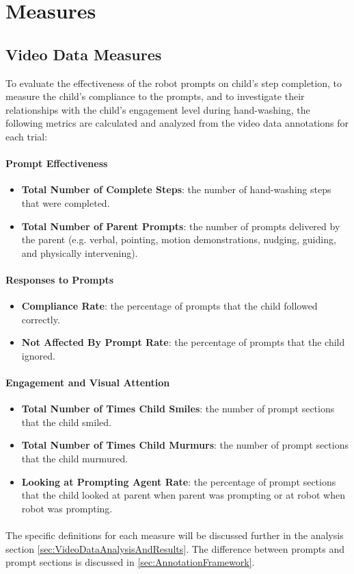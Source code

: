\section{Measures}
\label{sec:measures}

\subsection{Video Data Measures}
To evaluate the effectiveness of the robot prompts on child's step completion, to measure the child's compliance to the prompts, and to investigate their relationships with the child's engagement level during hand-washing, the following metrics are calculated and analyzed from the video data annotations for each trial:


\paragraph{Prompt Effectiveness}
\begin{itemize}
	\item \textbf{Total Number of Complete Steps}: the number of hand-washing steps that were completed.
	\item \textbf{Total Number of Parent Prompts}: the number of prompts delivered by the parent (e.g. verbal, pointing, motion demonstrations, nudging, guiding, and physically intervening).
\end{itemize}

\paragraph{Responses to Prompts}
\begin{itemize}
	\item \textbf{Compliance Rate}: the percentage of prompts that the child followed correctly.
	\item \textbf{Not Affected By Prompt Rate}: the percentage of prompts that the child ignored.
\end{itemize}

\paragraph{Engagement and Visual Attention}
\begin{itemize}
	\item \textbf{Total Number of Times Child Smiles}: the number of prompt sections that the child smiled.
	\item \textbf{Total Number of Times Child Murmurs}: the number of prompt sections that the child murmured.
	\item \textbf{Looking at Prompting Agent Rate}: the percentage of prompt sections that the child looked at parent when parent was prompting or at robot when robot was prompting.
\end{itemize}

\paragraph{} %
The specific definitions for each measure will be discussed further in the analysis section \ref{sec:VideoDataAnalysisAndResults}.  The difference between prompts and prompt sections is discussed in \ref{sec:AnnotationFramework}.